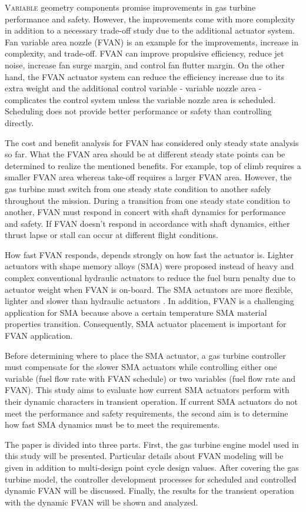 \lettrine[nindent=0pt]{V}{ariable} geometry components promise improvements in gas turbine performance and safety. However, the improvements come with more complexity in addition to a necessary trade-off study due to the additional actuator system. Fan variable area nozzle (FVAN) is an example for the improvements, increase in complexity, and trade-off. FVAN can improve propulsive efficiency, reduce jet noise, increase fan surge margin, and control fan flutter margin. On the other hand, the FVAN actuator system can reduce the efficiency increase due to its extra weight and the additional control variable - variable nozzle area - complicates the control system unless the variable nozzle area is scheduled. Scheduling does not provide better performance or safety than controlling directly. 

The cost and benefit analysis for FVAN has considered only steady state analysis so far. What the FVAN area should be at different steady state points can be determined to realize the mentioned benefits. For example, top of climb requires a smaller FVAN area whereas take-off requires a larger FVAN area. However, the gas turbine must switch from one steady state condition to another safely throughout the mission. During a transition from one steady state condition to another, FVAN must respond in concert with shaft dynamics for performance and safety. If FVAN doesn't respond in accordance with shaft dynamics, either thrust lapse or stall can occur at different flight conditions. 

How fast FVAN responds, depends strongly on how fast the actuator is. Lighter actuators with shape memory alloys (SMA) \cite{Mabe:2008,Mabe:2008:Paris} were proposed instead of heavy and complex conventional hydraulic actuators to reduce the fuel burn penalty due to actuator weight when FVAN is on-board. The SMA actuators are more flexible, lighter and slower than hydraulic actuators \cite{Rey:2001,Barooah:2002,Song:2007}. In addition, FVAN is a challenging application for SMA because above a certain temperature SMA material properties transition. Consequently, SMA actuator placement is important for FVAN application.  

Before determining where to place the SMA actuator, a gas turbine controller must compensate for the slower SMA actuators while controlling either one variable (fuel flow rate with FVAN schedule) or two variables (fuel flow rate and FVAN). This study aims to evaluate how current SMA actuators perform with their dynamic characters in transient operation. If current SMA actuators do not meet the performance and safety requirements, the second aim is to determine how fast SMA dynamics must be to meet the requirements.

The paper is divided into three parts. First, the gas turbine engine model used in this study will be presented. Particular details about FVAN modeling will be given in addition to multi-design point cycle design values. After covering the gas turbine model, the controller development processes for scheduled and controlled dynamic FVAN will be discussed. Finally, the results for the transient operation with the dynamic FVAN will be shown and analyzed. 